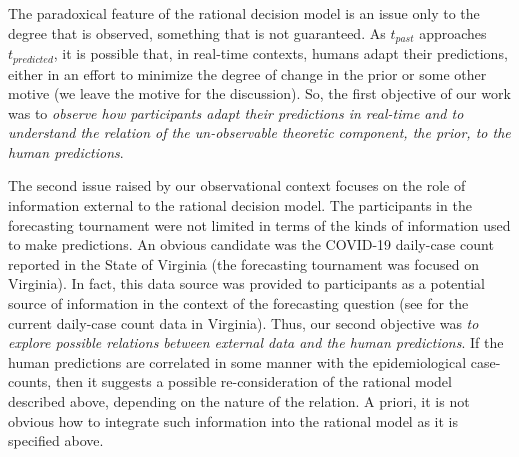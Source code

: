 The paradoxical feature of the rational decision model is an issue only to the degree that is observed, something that is not guaranteed. As $t_{past}$ approaches $t_{predicted}$, it is possible that, in real-time contexts, humans adapt their predictions, either in an effort to minimize the degree of change in the prior or some other motive (we leave the motive for the discussion). So, the first objective of our work was to \textit{observe how participants adapt their predictions in real-time and to understand the relation of the un-observable theoretic component, the prior, to the human predictions}.  

The second issue raised by our observational context focuses on the role of information external to the rational decision model.  The participants in the forecasting tournament were not limited in terms of the kinds of information used to make predictions.  An obvious candidate was the COVID-19 daily-case count reported in the State of Virginia (the forecasting tournament was focused on Virginia). In fact, this data source was provided to participants as a potential source of information in the context of the forecasting question (see \cite{VDHOnline} for the current daily-case count data in Virginia). Thus, our second objective was \textit{to explore possible relations between external data and the human predictions}. If the human predictions are correlated in some manner with the epidemiological case-counts, then it suggests a possible re-consideration of the rational model described above, depending on the nature of the relation.  A priori, it is not obvious how to integrate such information into the rational model as it is specified above.

